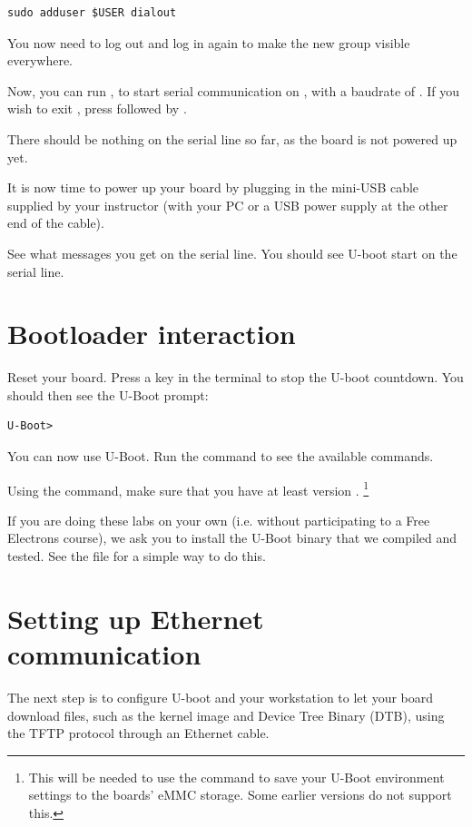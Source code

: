 \begin{verbatim}
sudo adduser $USER dialout
\end{verbatim}

You now need to log out and log in again to make the new group
visible everywhere.

Now, you can run , to start serial
communication on , with a baudrate of . If
you wish to exit , press \code{[Ctrl][a]} followed by
\code{[Ctrl][x]}.

There should be nothing on the serial line so far, as the board is not
powered up yet.

It is now time to power up your board by plugging in the mini-USB
cable supplied by your instructor (with your PC or a USB power supply at the
other end of the cable).

See what messages you get on the serial line. You should see U-boot
start on the serial line.

\section{Bootloader interaction}

Reset your board. Press a key in the  terminal to stop the U-boot
countdown. You should then see the U-Boot prompt:
\begin{verbatim}
U-Boot>
\end{verbatim}

You can now use U-Boot. Run the  command to see the available
commands.

Using the  command, make sure that you have at least version
.
\footnote{This will be needed to use the  command to
save your U-Boot environment settings to the boards' eMMC storage.
Some earlier versions do not support this.} 

If you are doing these labs on your own (i.e. without participating to a Free Electrons
course), we ask you to install the U-Boot binary that we compiled and
tested. See the 
file for a simple way to do this.

\section{Setting up Ethernet communication}

The next step is to configure U-boot and your workstation to let your
board download files, such as the kernel image and Device Tree Binary
(DTB), using the TFTP protocol through an Ethernet cable.

